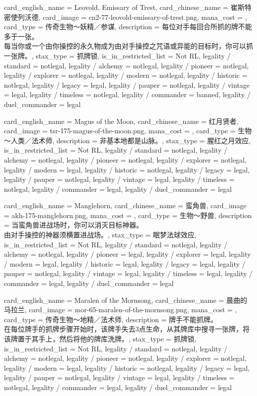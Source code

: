 \documentclass[lang = cn, color = black, 10pt]{AllThatStax}
\begin{document}
\card
{
	card_english_name = {Leovold, Emissary of Trest},
	card_chinese_name = {崔斯特密使列沃德},
	card_image = cn2-77-leovold-emissary-of-trest.png,
	mana_cost = ,
	card_type = 传奇生物～妖精／参谋,
	description = {每位对手每回合所抓的牌不能多于一张。\\
每当你或一个由你操控的永久物成为由对手操控之咒语或异能的目标时，你可以抓一张牌。},
	stax_type = 抓牌锁,
	is_in_restricted_list = Not RL,
	legality / standard = notlegal,
	legality / alchemy = notlegal,
	legality / pioneer = notlegal,
	legality / explorer = notlegal,
	legality / modern = notlegal,
	legality / historic = notlegal,
	legality / legacy = legal,
	legality / pauper = notlegal,
	legality / vintage = legal,
	legality / timeless = notlegal,
	legality / commander = banned,
	legality / duel_commander = legal
}

\card
{
	card_english_name = {Magus of the Moon},
	card_chinese_name = {红月贤者},
	card_image = tsr-175-magus-of-the-moon.png,
	mana_cost = ,
	card_type = 生物 ～人类／法术师,
	description = {非基本地都是山脉。},
	stax_type = 腥红之月效应,
	is_in_restricted_list = Not RL,
	legality / standard = notlegal,
	legality / alchemy = notlegal,
	legality / pioneer = notlegal,
	legality / explorer = notlegal,
	legality / modern = legal,
	legality / historic = notlegal,
	legality / legacy = legal,
	legality / pauper = notlegal,
	legality / vintage = legal,
	legality / timeless = notlegal,
	legality / commander = legal,
	legality / duel_commander = legal
}

\card
{
	card_english_name = {Manglehorn},
	card_chinese_name = {蛮角兽},
	card_image = akh-175-manglehorn.png,
	mana_cost = ,
	card_type = 生物～野兽,
	description = {当蛮角兽进战场时，你可以消灭目标神器。\\
由对手操控的神器须横置进战场。},
	stax_type = 眠梦法球效应,
	is_in_restricted_list = Not RL,
	legality / standard = notlegal,
	legality / alchemy = notlegal,
	legality / pioneer = legal,
	legality / explorer = legal,
	legality / modern = legal,
	legality / historic = legal,
	legality / legacy = legal,
	legality / pauper = notlegal,
	legality / vintage = legal,
	legality / timeless = legal,
	legality / commander = legal,
	legality / duel_commander = legal
}

\card
{
	card_english_name = {Maralen of the Mornsong},
	card_chinese_name = {晨曲的马拉兰},
	card_image = mor-65-maralen-of-the-mornsong.png,
	mana_cost = ,
	card_type = 传奇生物～地精／法术师,
	description = {牌手不能抓牌。\\
在每位牌手的抓牌步骤开始时，该牌手失去3点生命，从其牌库中搜寻一张牌，将该牌置于其手上，然后将他的牌库洗牌。},
	stax_type = 抓牌锁,
	is_in_restricted_list = Not RL,
	legality / standard = notlegal,
	legality / alchemy = notlegal,
	legality / pioneer = notlegal,
	legality / explorer = notlegal,
	legality / modern = legal,
	legality / historic = notlegal,
	legality / legacy = legal,
	legality / pauper = notlegal,
	legality / vintage = legal,
	legality / timeless = notlegal,
	legality / commander = legal,
	legality / duel_commander = legal
}
\end{document}
